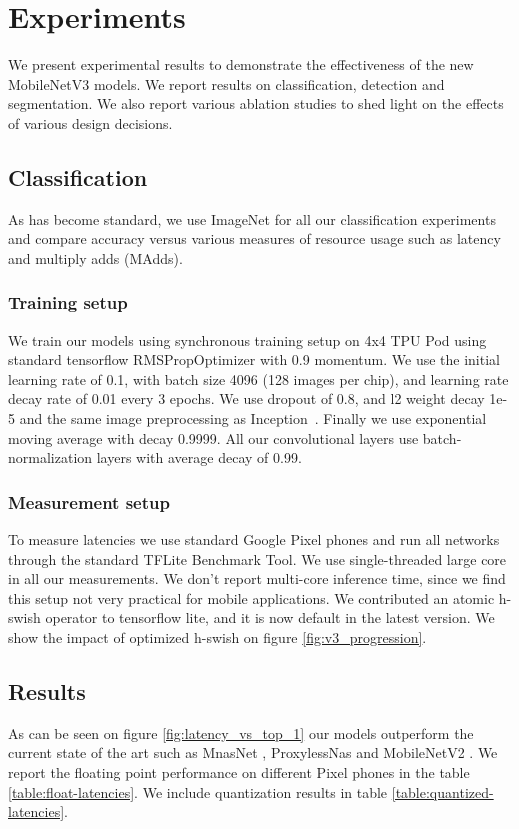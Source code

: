 \documentclass[10pt,twocolumn,letterpaper]{article}
\begin{document}
%
\section{Experiments}
\label{section:experiments}
We present experimental results to demonstrate the effectiveness of the new MobileNetV3 models. We report results on classification, detection and segmentation. We also report various ablation studies to shed light on the effects of various design decisions.

\subsection{Classification}
As has become standard, we use ImageNet\cite{russakovsky:2015:ILS:2846547.2846559} for all our classification experiments and compare accuracy versus various measures of resource usage such as latency and multiply adds (MAdds).  
\subsubsection{Training setup}
We train our models using synchronous training setup  on
4x4 TPU Pod \cite{tpu-intro} using standard tensorflow RMSPropOptimizer with 0.9 momentum. We use the initial learning rate of 0.1, with batch size 4096 (128 images per chip), and learning rate decay rate of 0.01 every 3 epochs. We use dropout of 0.8, and l2 weight decay 1e-5 and the same image preprocessing as Inception~\cite{InceptionV4}. Finally we use exponential moving average with decay 0.9999. All our convolutional layers use batch-normalization layers with average decay of 0.99. 

\subsubsection{Measurement setup}
To measure latencies we use standard Google Pixel phones and run all networks through the standard TFLite
Benchmark Tool. We use single-threaded large core in all our measurements. We don't report multi-core inference
time, since we find this setup not very practical for mobile applications. We contributed an atomic h-swish
operator to tensorflow lite, and it is now default in the latest version. We show the impact of optimized 
h-swish on figure \ref{fig:v3_progression}.

\subsection{Results}
As can be seen on figure \ref{fig:latency_vs_top_1} our models outperform the current state of the art such as
MnasNet \cite{mnasnet}, ProxylessNas \cite{proxyless}
and MobileNetV2 \cite{mobilenetv2}. We report the floating point performance on different Pixel phones in the
table \ref{table:float-latencies}. We include quantization results in table \ref{table:quantized-latencies}.
\end{document}

